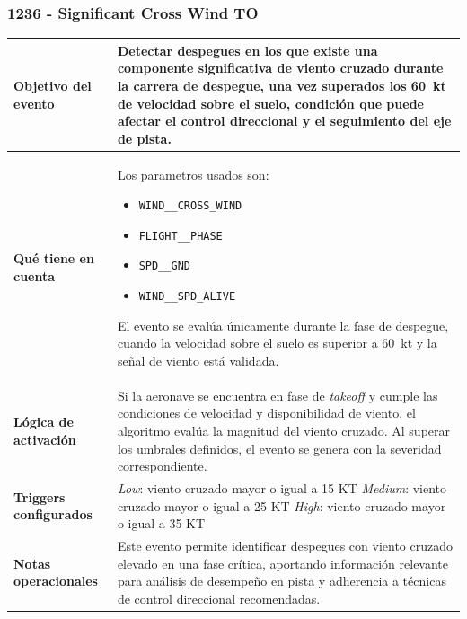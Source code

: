 \documentclass[11pt,a4paper]{article}
\begin{document}
	\subsubsection{1236 - Significant Cross Wind TO}
	\begin{table}[H]
		\centering
		\renewcommand{\arraystretch}{1.3}
		\begin{tabular}{p{5cm} p{9.5cm}}
			\hline
			\textbf{Objetivo del evento} &
			Detectar despegues en los que existe una componente significativa de viento cruzado durante la carrera de despegue, una vez superados los \SI{60}{kt} de velocidad sobre el suelo, condición que puede afectar el control direccional y el seguimiento del eje de pista. \\
			\hline
			\textbf{Qué tiene en cuenta} & Los parametros usados son:
			\begin{itemize}
				\item \texttt{WIND\_\_CROSS\_WIND}
				\item \texttt{FLIGHT\_\_PHASE}
				\item \texttt{SPD\_\_GND}
				\item \texttt{WIND\_\_SPD\_ALIVE}
			\end{itemize}
			El evento se evalúa únicamente durante la fase de despegue, cuando la velocidad sobre el suelo es superior a \SI{60}{kt} y la señal de viento está validada. \\
			\hline
			\textbf{Lógica de activación} &
			Si la aeronave se encuentra en fase de \textit{takeoff} y cumple las condiciones de velocidad y disponibilidad de viento, el algoritmo evalúa la magnitud del viento cruzado. Al superar los umbrales definidos, el evento se genera con la severidad correspondiente. \\
			\hline
			\textbf{Triggers configurados} &
			\textit{Low}: viento cruzado mayor o igual a 15 KT \newline
			\textit{Medium}: viento cruzado mayor o igual a 25 KT \newline
			\textit{High}: viento cruzado mayor o igual a 35 KT \\
			\hline
			\textbf{Notas operacionales} &
			Este evento permite identificar despegues con viento cruzado elevado en una fase crítica, aportando información relevante para análisis de desempeño en pista y adherencia a técnicas de control direccional recomendadas. \\
			\hline
		\end{tabular}
	\end{table}
	
\end{document}

